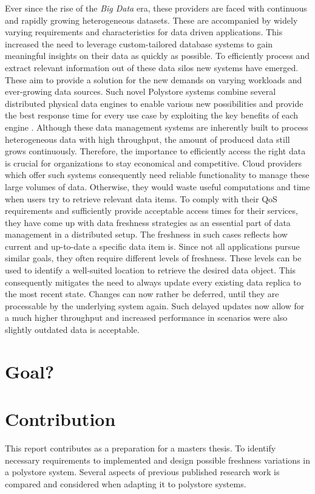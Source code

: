 Ever since the rise of the \emph{Big Data} era, these providers are faced with continuous
and rapidly growing heterogeneous datasets. These are accompanied by widely varying requirements 
and characteristics for data driven applications. This increased the need to leverage custom-tailored 
database systems to gain meaningful insights on their data as quickly as possible.
To efficiently process and extract relevant information out of these data silos new systems
have emerged. These aim to provide a solution for the new demands on varying workloads 
and ever-growing data sources.
Such novel Polystore systems combine several distributed physical data engines to enable various
new possibilities and provide the best response time for every use case by exploiting
the key benefits of each engine \cite{stonebraker:2005} \cite{polypheny2020}. Although these data management systems are inherently
built to process heterogeneous data with high throughput, the amount of produced data
still grows continuously.
Therefore, the importance to efficiently access the right data is crucial
for organizations to stay economical and competitive. Cloud providers which offer such systems consequently 
need reliable functionality to manage these large volumes of data. Otherwise, they would waste useful 
computations and time when users try to retrieve relevant data items\cite{levandowski2013}.
To comply with their QoS requirements and sufficiently provide acceptable access times for their services, 
they have come up with data freshness strategies as an essential part of data management in a
distributed setup. 
The freshness in such cases reflects how current and up-to-date a specific data item is.
Since not all applications pursue similar goals, they often require different levels of freshness.
These levels can be used to identify a well-suited location to retrieve the desired data object. 
This consequently mitigates the need to always update every existing data replica to the most recent state.
Changes can now rather be deferred, until they are processable by the underlying system again.
Such delayed updates now allow for a much higher throughput and increased performance in scenarios were also slightly 
outdated data is acceptable.

\section{Goal?}

\section{Contribution}
This report contributes as a preparation for a masters thesis. To identify necessary requirements to implemented and design possible 
freshness variations in a polystore system. Several aspects of previous published research work is compared and considered when adapting it to polystore systems.


